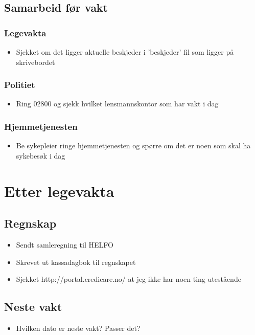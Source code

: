 	\section{Samarbeid før vakt}\label{sec:start_samarbeid}
		\subsection{Legevakta}\label{sec:sam_lvintern}
			\begin{itemize}
				\item Sjekket om det ligger aktuelle beskjeder i 'beskjeder' fil som ligger på skrivebordet
			\end{itemize}
		\subsection{Politiet}\label{sec:sam_pol}%
			\begin{itemize}
				\item Ring 02800 og sjekk hvilket lensmannskontor som har vakt i dag
			\end{itemize}
		\subsection{Hjemmetjenesten}\label{sec:sam_hjtj}%
			\begin{itemize}
				\item Be sykepleier ringe hjemmetjenesten og spørre om det er noen som skal ha sykebesøk i dag
		\end{itemize}
		\label{lst:start_kontor_num}
\newpage
\chapter{Etter legevakta}
	\section{Regnskap}\label{sec:elv_regns}
		\begin{itemize}
			\item Sendt samleregning til HELFO
			\item Skrevet ut kassadagbok til regnskapet
			\item Sjekket http://portal.credicare.no/ at jeg ikke har noen ting utestående
		\end{itemize}
	\section{Neste vakt}\label{sec:elv_nxtv}
		\begin{itemize}
			\item Hvilken dato er neste vakt? Passer det?
		\end{itemize}
